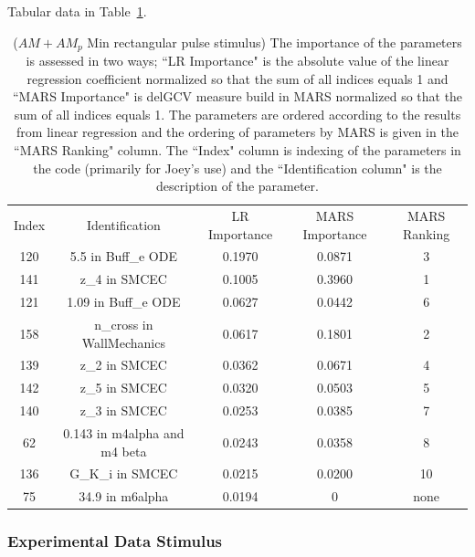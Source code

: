 \documentclass[12pt]{article}
\numberwithin{equation}{section}
\begin{document}
Tabular data in Table~\ref{qoi_AM_AMp_Min_rec}.

 
\begin{table}[h]
\centering
\begin{tabular}{ccccc}
Index & Identification & LR Importance & MARS Importance & MARS Ranking \\
120 & 5.5 in Buff\_e ODE & 0.1970 & 0.0871 & 3\\
141 & z\_4 in SMCEC & 0.1005 & 0.3960 & 1\\
121 & 1.09 in Buff\_e ODE & 0.0627 & 0.0442 & 6\\
158 & n\_cross in WallMechanics & 0.0617 & 0.1801 & 2\\
139 & z\_2 in SMCEC & 0.0362 & 0.0671 & 4\\
142 & z\_5 in SMCEC & 0.0320 & 0.0503 & 5\\
140 & z\_3 in SMCEC & 0.0253 & 0.0385 & 7\\
62 & 0.143 in m4alpha and m4 beta & 0.0243 & 0.0358 & 8\\
136 & G\_K\_i in SMCEC & 0.0215 & 0.0200 & 10\\
75 & 34.9 in m6alpha & 0.0194 & 0 & none\\
\end{tabular}
\caption{($AM+AM_p$ Min rectangular pulse stimulus) The importance of the parameters is assessed in two ways; ``LR Importance" is the absolute value of the linear regression coefficient normalized so that the sum of all indices equals 1 and ``MARS Importance" is delGCV measure build in MARS normalized so that the sum of all indices equals 1. The parameters are ordered according to the results from linear regression and the ordering of parameters by MARS is given in the ``MARS Ranking" column. The ``Index" column is indexing of the parameters in the code (primarily for Joey's use) and the ``Identification column" is the description of the parameter.}
\label{qoi_AM_AMp_Min_rec}
\end{table}

\newpage

\subsubsection{Experimental Data Stimulus}
\end{document}
